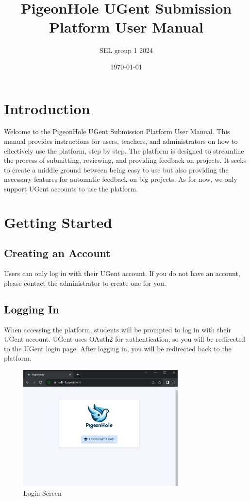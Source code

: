 \documentclass{article}
\title{PigeonHole UGent Submission Platform User Manual}
\author{SEL group 1 2024}
\date{\today}
\begin{document}
\maketitle

\tableofcontents

\section{Introduction}
Welcome to the PigeonHole UGent Submission Platform User Manual. This manual provides instructions for users, teachers, and administrators on how to effectively use the platform, step by step. The platform is designed to streamline the process of submitting, reviewing, and providing feedback on projects. It seeks to create a middle ground between being easy to use but also providing the necessary features for automatic feedback on big projects. As for now, we only support UGent accounts to use the platform.

\section{Getting Started}
\subsection{Creating an Account}
Users can only log in with their UGent account. If you do not have an account, please contact the administrator to create one for you.

\subsection{Logging In}
When accessing the platform, students will be prompted to log in with their UGent account. UGent uses OAuth2 for authentication, so you will be redirected to the UGent login page. After logging in, you will be redirected back to the platform.

\begin{figure}[H]
    \centering
    \includegraphics[width=0.75\textwidth]{images/login.png}
    \caption{Login Screen}
\end{figure}
\end{document}
